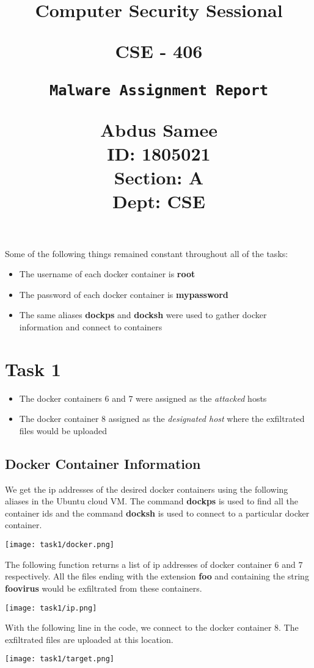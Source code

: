 \documentclass{article}
\title{%
  \begin{center}
        \vspace*{1cm}
            
        \Huge
        \textbf{Computer Security Sessional}
            
        \vspace{0.5cm}
        \LARGE
        CSE - 406
            
        \vspace{2cm}
            
        \Huge
        \texttt{Malware Assignment Report}
                        
        \vspace{0.8cm}
                        
        \Large
        Abdus Samee\\
        ID: 1805021\\
        Section: A\\
        Dept: CSE\\
    \end{center}
  }
\date{}
\begin{document}
\maketitle
\newpage

Some of the following things remained constant throughout all of the tasks:
\begin{itemize}
    \item The username of each docker container is \textbf{root}
    \item The password of each docker container is \textbf{mypassword}
    \item The same aliases \textbf{dockps} and \textbf{docksh} were used to gather docker information and connect to containers
\end{itemize}

\section{Task 1}
\begin{itemize}
    \item The docker containers $6$ and $7$ were assigned as the \textit{attacked} hosts
    \item The docker container $8$ assigned as the \textit{designated host} where the exfiltrated files would be uploaded
\end{itemize}

\subsection{Docker Container Information}
We get the ip addresses of the desired docker containers using the following aliases in the Ubuntu cloud VM. The command \textbf{dockps} is used to find all the container ids and the command \textbf{docksh} is used to connect to a particular docker container.
\begin{center}
    \texttt{[image: task1/docker.png]}
\end{center}

The following function returns a list of ip addresses of docker container $6$ and $7$ respectively. All the files ending with the extension \textbf{foo} and containing the string \textbf{foovirus} would be exfiltrated from these containers.
\begin{center}
    \texttt{[image: task1/ip.png]}
\end{center}

With the following line in the code, we connect to the docker container $8$. The exfiltrated files are uploaded at this location.
\begin{center}
    \texttt{[image: task1/target.png]}
\end{center}
\end{document}
